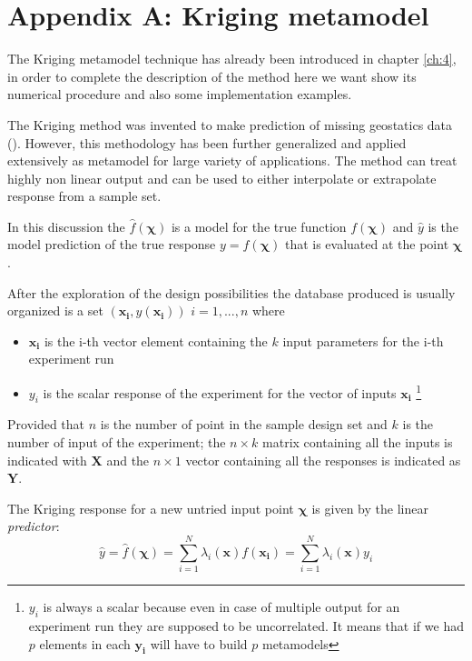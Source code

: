 \chapter*{Appendix A: Kriging metamodel}

The Kriging metamodel technique has already been introduced in chapter \ref{ch:4}, in order to complete the description of the method here we want show its numerical procedure and also some implementation examples.

The Kriging method was invented to make prediction of missing geostatics data (\citet{krige1951statistical}). However, this methodology has been further generalized and applied extensively as metamodel for large variety of applications.
The method can treat highly non linear output and can be used to either interpolate or extrapolate response from a sample set.

In this discussion the $\hat{f}(\boldsymbol{\chi})$ is a model for the true function $f(\boldsymbol{\chi})$ and $\hat{y}$ is the model prediction of the true response $y = f(\boldsymbol{\chi})$ that is evaluated at the point $\boldsymbol{\chi}$. 

After the exploration of the design possibilities the database produced is usually organized is a set $(\mathbf{x_i}, y(\mathbf{x_i}))$  $i=1,...,n$ where
\begin{itemize}
	\item $\mathbf{x_i}$ is the i-th vector element containing the $k$ input parameters for the i-th experiment run
	\item $y_i$ is the scalar response of the experiment for the vector of inputs $\mathbf{x_i}$ \footnote{$y_i$ is always a scalar because even in case of multiple output for an experiment run they are supposed to be uncorrelated. It means that if we had $p$ elements in each $\mathbf{y_i}$ will have to build $p$ metamodels}
\end{itemize}

Provided that $n$ is the number of point in the sample design set and $k$ is the number of input of the experiment; the $n \times k$ matrix containing all the inputs is indicated with $\mathbf{X}$ and the $n \times 1$ vector containing all the responses is indicated as $\mathbf{Y}$.

The Kriging response for a new untried input point $\boldsymbol{\chi}$ is given by the linear \textit{predictor}:
\begin{equation}
\hat{y} = \hat{f}(\boldsymbol{\chi}) = \sum_{i=1}^{N} \lambda_i(\mathbf{x}) f(\mathbf{x_i}) =  \sum_{i=1}^{N} \lambda_i(\mathbf{x}) y_i
\end{equation}

